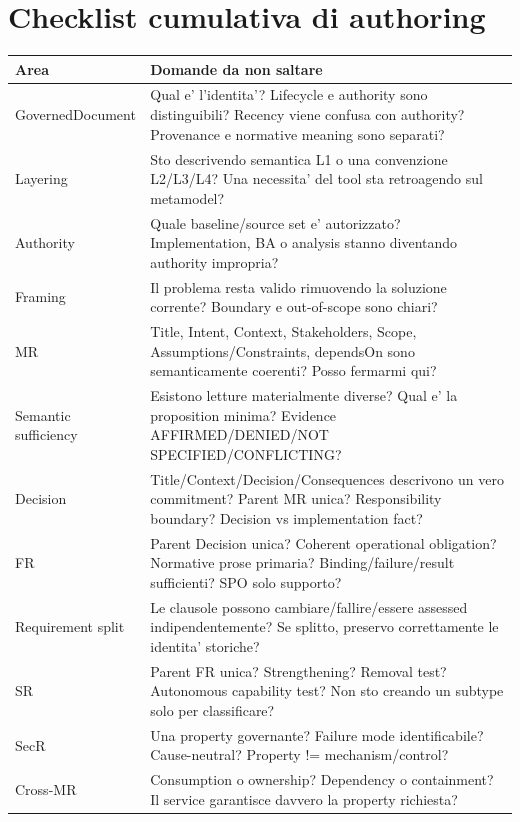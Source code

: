 \documentclass[11pt,a4paper]{article}
\begin{document}
\section{Checklist cumulativa di authoring}

\begin{longtable}{L{36mm}L{110mm}}
\toprule
\textbf{Area} & \textbf{Domande da non saltare} \\
\midrule\endhead
GovernedDocument & Qual e' l'identita'? Lifecycle e authority sono distinguibili? Recency viene confusa con authority? Provenance e normative meaning sono separati? \\
Layering & Sto descrivendo semantica L1 o una convenzione L2/L3/L4? Una necessita' del tool sta retroagendo sul metamodel? \\
Authority & Quale baseline/source set e' autorizzato? Implementation, BA o analysis stanno diventando authority impropria? \\
Framing & Il problema resta valido rimuovendo la soluzione corrente? Boundary e out-of-scope sono chiari? \\
MR & Title, Intent, Context, Stakeholders, Scope, Assumptions/Constraints, dependsOn sono semanticamente coerenti? Posso fermarmi qui? \\
Semantic sufficiency & Esistono letture materialmente diverse? Qual e' la proposition minima? Evidence AFFIRMED/DENIED/NOT SPECIFIED/CONFLICTING? \\
Decision & Title/Context/Decision/Consequences descrivono un vero commitment? Parent MR unica? Responsibility boundary? Decision vs implementation fact? \\
FR & Parent Decision unica? Coherent operational obligation? Normative prose primaria? Binding/failure/result sufficienti? SPO solo supporto? \\
Requirement split & Le clausole possono cambiare/fallire/essere assessed indipendentemente? Se splitto, preservo correttamente le identita' storiche? \\
SR & Parent FR unica? Strengthening? Removal test? Autonomous capability test? Non sto creando un subtype solo per classificare? \\
SecR & Una property governante? Failure mode identificabile? Cause-neutral? Property != mechanism/control? \\
Cross-MR & Consumption o ownership? Dependency o containment? Il service garantisce davvero la property richiesta? \\

\end{longtable}
\end{document}
